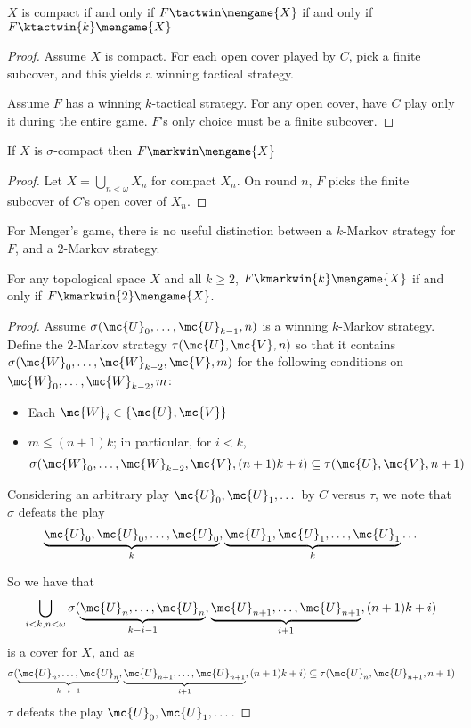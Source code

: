   \begin{prop}
    $X$ is compact if and only if $F \tactwin \mengame{X}$ if and only if $F \ktactwin{k} \mengame{X}$
  \end{prop}

  \begin{proof}
    Assume $X$ is compact. For each open cover played by $C$, pick a finite subcover, and this yields a winning tactical strategy.

    Assume $F$ has a winning $k$-tactical strategy. For any open cover, have $C$ play only it during the entire game. $F$'s only choice must be a finite subcover.
  \end{proof}

  \begin{prop}
    If $X$ is $\sigma$-compact then $F \markwin \mengame{X}$
  \end{prop}

  \begin{proof}
    Let $X=\bigcup_{n<\omega} X_n$ for compact $X_n$. On round $n$, $F$ picks the finite subcover of $C$'s open cover of $X_n$.
  \end{proof}

  For Menger's game, there is no useful distinction between a $k$-Markov strategy for $F$, and a $2$-Markov strategy.

  \begin{thm}
  For any topological space $X$ and all $k \geq 2$, $F \kmarkwin{k} \mengame{X}$ if and only if $F \kmarkwin{2} \mengame{X}$.
  \end{thm}

  \begin{proof}
  Assume $\sigma(\mc{U}_0,\dots,\mc{U}_{k-1},n)$ is a winning $k$-Markov strategy. Define the $2$-Markov strategy $\tau(\mc{U},\mc{V},n)$ so that it contains $\sigma(\mc{W}_0,\dots,\mc{W}_{k-2},\mc{V},m)$ for the following conditions on $\mc{W}_0,\dots,\mc{W}_{k-2},m$:
    \begin{itemize}
    \item Each $\mc{W}_i \in \{\mc{U},\mc{V}\}$
    \item $m \leq (n+1)k$; in particular, for $i<k$, 
      \[
        \sigma(\mc{W}_0,\dots,\mc{W}_{k-2},\mc{V},(n+1)k+i)
        \subseteq 
        \tau(\mc{U},\mc{V},n+1) 
      \]
    \end{itemize}

  Considering an arbitrary play $\mc{U}_0, \mc{U}_1, \dots$ by $C$ versus $\tau$, we note that $\sigma$ defeats the play 
  \[
    \underbrace{\mc{U}_0,\mc{U}_0,\dots,\mc{U}_0}_{k},
    \underbrace{\mc{U}_1,\mc{U}_1,\dots,\mc{U}_1}_{k}
    \dots
  \]

  So we have that
    \[
      \bigcup_{i<k, n<\omega} \sigma(
      \underbrace{\mc{U}_n,\dots,\mc{U}_n}_{k-i-1},
      \underbrace{\mc{U}_{n+1},\dots,\mc{U}_{n+1}}_{i+1},
      (n+1)k+i)
    \]
  is a cover for $X$, and as 
    \[
      \sigma(
      \underbrace{\mc{U}_n,\dots,\mc{U}_n}_{k-i-1},
      \underbrace{\mc{U}_{n+1},\dots,\mc{U}_{n+1}}_{i+1},
      (n+1)k+i)
      \subseteq 
      \tau(\mc{U}_n,\mc{U}_{n+1},n+1)
    \]
  $\tau$ defeats the play $\mc{U}_0, \mc{U}_1, \dots$.
  \end{proof}

